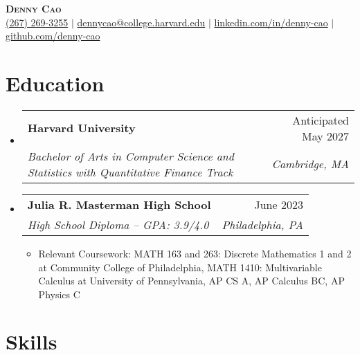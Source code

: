 \documentclass[letterpaper,11pt]{article}
\makeatletter
\newcommand{\resumeItem}[1]{
  \item\small{
    {#1 \vspace{-2pt}}
  }
}
\newcommand{\resumeSubheading}[4]{
  \vspace{-2pt}\item
    \begin{tabular*}{0.97\textwidth}[t]{l@{\extracolsep{\fill}}r}
      \textbf{#1} & #2 \\
      \small#3 & \small #4   \\
    \end{tabular*}\vspace{-7pt}
}
\newcommand{\resumeSubHeadingListStart}{\begin{itemize}[leftmargin=0.15in, label={}]}
\newcommand{\resumeSubHeadingListEnd}{\end{itemize}}
\newcommand{\resumeItemListStart}{\begin{itemize}}
\newcommand{\resumeItemListEnd}{\end{itemize}\vspace{-5pt}}
\makeatother
\begin{document}

\begin{center}
  \textbf{\Huge \scshape Denny Cao} \\ \vspace{1pt}
  \small \href{tel:12672693255}{(267) 269-3255} $|$ \href{mailto:dennycao@college.harvard.edu}{dennycao@college.harvard.edu} 
$|$ \href{https://www.linkedin.com/in/denny-cao/}{linkedin.com/in/denny-cao} $|$     \href{https://github.com/denny-cao}{github.com/denny-cao}
\end{center}


\section{Education}
  \resumeSubHeadingListStart
    \resumeSubheading
      {Harvard University}{Anticipated May 2027}
      {\textit{Bachelor of Arts in Computer Science and Statistics with Quantitative Finance Track}}{\textit{Cambridge, MA}}
    \resumeSubheading
      {Julia R. Masterman High School}{June 2023}
      {\textit{High School Diploma -- GPA: 3.9/4.0}}{\textit{Philadelphia, PA}}
      \resumeItemListStart
        \resumeItem{Relevant Coursework: MATH 163 and 263: Discrete Mathematics 1 and 2 at Community College of Philadelphia, MATH 1410: Multivariable Calculus at University of Pennsylvania, AP CS A, AP Calculus BC, AP Physics C}
      \resumeItemListEnd
  \resumeSubHeadingListEnd



\section{Skills}
\end{document}
